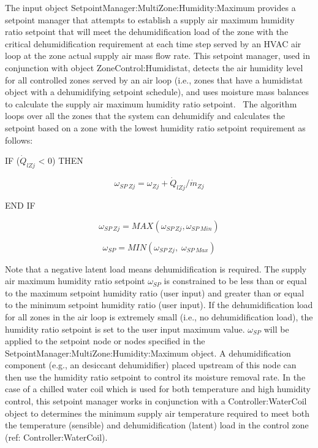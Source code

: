 The input object SetpointManager:MultiZone:Humidity:Maximum provides a setpoint manager that attempts to establish a supply air maximum humidity ratio setpoint that will meet the dehumidification load of the zone with the critical dehumidification requirement at each time step served by an HVAC air loop at the zone actual supply air mass flow rate. This setpoint manager, used in conjunction with object ZoneControl:Humidistat, detects the air humidity level for all controlled zones served by an air loop (i.e., zones that have a humidistat object with a dehumidifying setpoint schedule), and uses moisture mass balances to calculate the supply air maximum humidity ratio setpoint.~ The algorithm loops over all the zones that the system can dehumidify and calculates the setpoint based on a zone with the lowest humidity ratio setpoint requirement as follows:

IF (\({\dot Q_{lZj}}\) \textless{} 0) THEN

\begin{equation}
{\omega_{SP~Zj}} = {\omega_{Zj}} + {{{{\dot Q}_{lZj}}} / {{{\dot m}_{Zj}}}}
\end{equation}

END IF

\begin{equation}
{\omega_{SP~Zj}} = MAX\left( {{\omega_{SP~Zj}},{\omega_{SP~Min}}} \right)
\end{equation}

\begin{equation}
{\omega_{SP}} = MIN\left( {{\omega_{SP~Zj}},\;{\omega_{SP~Max}}} \right)
\end{equation}

Note that a negative latent load means dehumidification is required. The supply air maximum humidity ratio setpoint \({\omega_{SP}}\) is constrained to be less than or equal to the maximum setpoint humidity ratio (user input) and greater than or equal to the minimum setpoint humidity ratio (user input). If the dehumidification load for all zones in the air loop is extremely small (i.e., no dehumidification load), the humidity ratio setpoint is set to the user input maximum value. \({\omega_{SP}}\) will be applied to the setpoint node or nodes specified in the SetpointManager:MultiZone:Humidity:Maximum object. A dehumidification component (e.g., an desiccant dehumidifier) placed upstream of this node can then use the humidity ratio setpoint to control its moisture removal rate. In the case of a chilled water coil which is used for both temperature and high humidity control, this setpoint manager works in conjunction with a Controller:WaterCoil object to determines the minimum supply air temperature required to meet both the temperature (sensible) and dehumidification (latent) load in the control zone (ref: Controller:WaterCoil).

